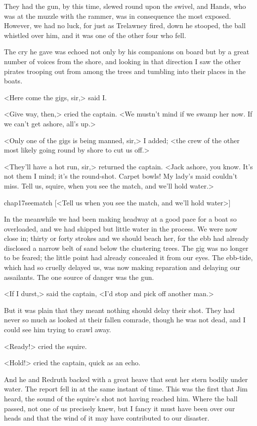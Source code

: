 They had the gun, by this time, slewed round upon the swivel, and Hands, who was at the muzzle with the rammer, was in consequence the most exposed. However, we had no luck, for just as Trelawney fired, down he stooped, the ball whistled over him, and it was one of the other four who fell.

The cry he gave was echoed not only by his companions on board but by a great number of voices from the shore, and looking in that direction I saw the other pirates trooping out from among the trees and tumbling into their places in the boats.

<Here come the gigs, sir,> said I\@.

<Give way, then,> cried the captain. <We mustn't mind if we swamp her now. If we can't get ashore, all's up.>

<Only one of the gigs is being manned, sir,> I added; <the crew of the other most likely going round by shore to cut us off.>

<They'll have a hot run, sir,> returned the captain. <Jack ashore, you know. It's not them I mind; it's the round-shot. Carpet bowls! My lady's maid couldn't miss. Tell us, squire, when you see the match, and we'll hold water.>

\begin{bwbigpic}
	[\basicscale]
	{chap17seematch}
	[<Tell us when you see the match, and we'll hold water>]
\end{bwbigpic}

In the meanwhile we had been making headway at a good pace for a boat so overloaded, and we had shipped but little water in the process. We were now close in; thirty or forty strokes and we should beach her, for the ebb had already disclosed a narrow belt of sand below the clustering trees. The gig was no longer to be feared; the little point had already concealed it from our eyes. The ebb-tide, which had so cruelly delayed us, was now making reparation and delaying our assailants. The one source of danger was the gun.

<If I durst,> said the captain, <I'd stop and pick off another man.>

But it was plain that they meant nothing should delay their shot. They had never so much as looked at their fallen comrade, though he was not dead, and I could see him trying to crawl away.

<Ready!> cried the squire.

<Hold!> cried the captain, quick as an echo.

And he and Redruth backed with a great heave that sent her stern bodily under water. The report fell in at the same instant of time. This was the first that Jim heard, the sound of the squire's shot not having reached him. Where the ball passed, not one of us precisely knew, but I fancy it must have been over our heads and that the wind of it may have contributed to our disaster.

